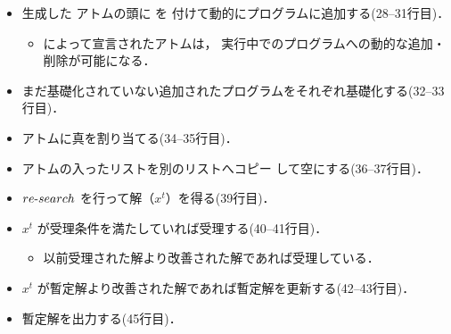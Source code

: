\begin{itemize}
\item 生成した  アトムの頭に  を
付けて動的にプログラムに追加する(28--31行目)．
 \begin{itemize}
  \item {} によって宣言されたアトムは，
  実行中でのプログラムへの動的な追加・削除が可能になる．
 \end{itemize}
\item まだ基礎化されていない追加されたプログラムをそれぞれ基礎化する(32--33行目)．
\item {} アトムに真を割り当てる(34--35行目)．
\item {} アトムの入ったリストを別のリストへコピー
して空にする(36--37行目)．
\item $re\mathchar`-search$ を行って解（$x^{t}$）を得る(39行目)．
\item $x^{t}$ が受理条件を満たしていれば受理する(40--41行目)．
 \begin{itemize}
  \item 以前受理された解より改善された解であれば受理している．
 \end{itemize}
\item $x^{t}$ が暫定解より改善された解であれば暫定解を更新する(42--43行目)．
\item 暫定解を出力する(45行目)．
\end{itemize}

